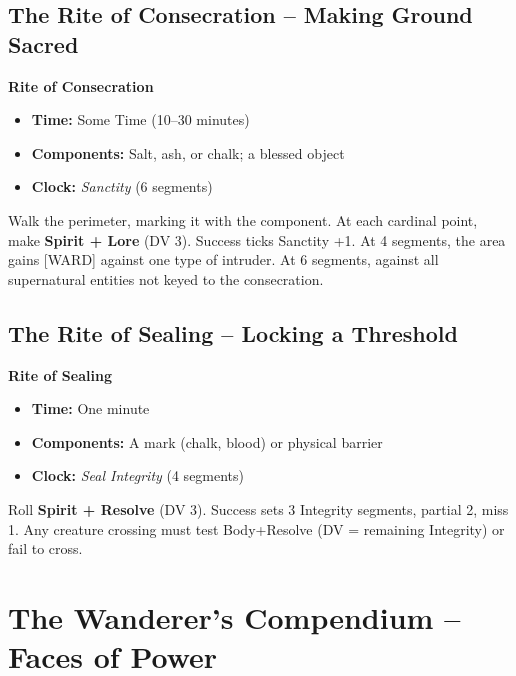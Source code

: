 \documentclass[10pt,a5paper]{book}
\begin{document}
\section{The Rite of Consecration -- Making Ground Sacred}

\begin{tcolorbox}[colback=blue!5, colframe=blue!70]
\textbf{Rite of Consecration}
\begin{itemize}
    \item \textbf{Time:} Some Time (10--30 minutes)
    \item \textbf{Components:} Salt, ash, or chalk; a blessed object
    \item \textbf{Clock:} \textit{Sanctity} (6 segments)
\end{itemize}
\end{tcolorbox}

Walk the perimeter, marking it with the component. At each cardinal point, make \textbf{Spirit + Lore} (DV 3). Success ticks Sanctity +1. At 4 segments, the area gains [WARD] against one type of intruder. At 6 segments, against all supernatural entities not keyed to the consecration.

\section{The Rite of Sealing -- Locking a Threshold}

\begin{tcolorbox}[colback=blue!5, colframe=blue!70]
\textbf{Rite of Sealing}
\begin{itemize}
    \item \textbf{Time:} One minute
    \item \textbf{Components:} A mark (chalk, blood) or physical barrier
    \item \textbf{Clock:} \textit{Seal Integrity} (4 segments)
\end{itemize}
\end{tcolorbox}

Roll \textbf{Spirit + Resolve} (DV 3). Success sets 3 Integrity segments, partial 2, miss 1. Any creature crossing must test Body+Resolve (DV = remaining Integrity) or fail to cross.

\clearpage


\chapter{The Wanderer's Compendium -- Faces of Power}
\end{document}
